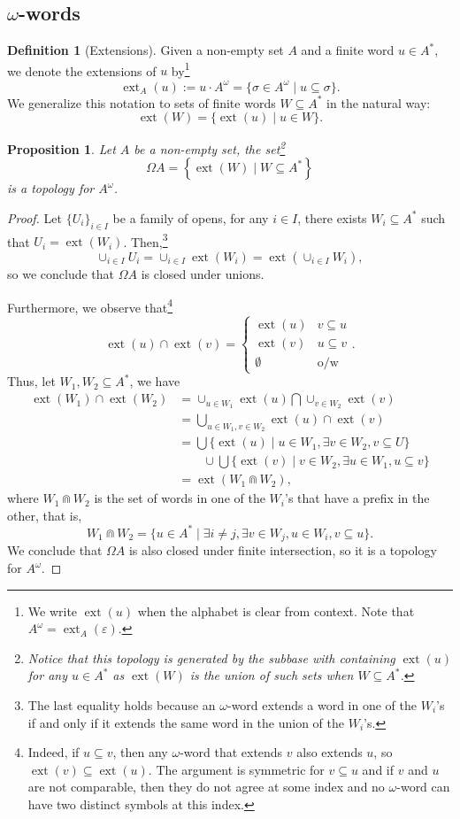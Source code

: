 \documentclass{tufte-handout} %
\newtheorem{prop}[thm]{Proposition}
\theoremstyle{definition}
\newtheorem{defn}[thm]{Definition}
\theoremstyle{remark}
\newcommand{\bra}[1]{\left(#1\right)}
\newcommand{\0}{\textsf{0}}
\newcommand{\1}{\textsf{1}}
\DeclareMathOperator{\ext}{ext}
\begin{document}
\subsection{$\omega$-words}
\begin{defn}[Extensions]
	Given a non-empty set $A$ and a finite word $u \in A^*$, we denote the extensions of $u$ by\footnote{We write $\ext(u)$ when the alphabet is clear from context. Note that $A^{\omega} = \ext_A(\varepsilon)$.}
	\[\ext_A(u) := u\cdot A^{\omega} = \{ \sigma \in A^{\omega} \mid u\subseteq \sigma\}.\]
	We generalize this notation to sets of finite words $W \subseteq A^*$ in the natural way: \[\ext(W) = \{ \ext(u) \mid u \in W\}.\]
\end{defn}
\begin{prop}
	Let $A$ be a non-empty set, the set\footnote{Notice that this topology is generated by the subbase with containing $\ext(u)$ for any $u \in A^*$ as $\ext(W)$ is the union of such sets when $W \subseteq A^*$.} \[ \Omega A = \left\{ \ext(W) \mid W \subseteq A^* \right\} \]
	is a topology for $A^{\omega}$.
\end{prop}
\begin{proof}
	Let $\{U_i\}_{i \in I}$ be a family of opens, for any $i \in I$, there exists $W_i \subseteq A^*$ such that $U_i = \ext(W_i)$. Then,\footnote{The last equality holds because an $\omega$-word extends a word in one of the $W_i$'s if and only if it extends the same word in the union of the $W_i$'s.}
	\[\cup_{i \in I} U_i = \cup_{i \in I}\ext(W_i) = \ext\bra{\cup_{i \in I} W_i},\]
	so we conclude that $\Omega A$ is closed under unions.
	
	Furthermore, we observe that\footnote{Indeed, if $u\subseteq v$, then any $\omega$-word that extends $v$ also extends $u$, so $\ext(v) \subseteq \ext(u)$. The argument is symmetric for $v\subseteq u$ and if $v$ and $u$ are not comparable, then they do not agree at some index and no $\omega$-word can have two distinct symbols at this index.} \[\ext(u) \cap \ext(v) = \begin{cases}\ext(u) & v \subseteq u\\\ext(v) &u\subseteq v\\ \emptyset &\text{o/w}\end{cases}.\]
	Thus, let $W_1, W_2 \subseteq A^*$, we have 
	\begin{align*}
	\ext(W_1) \cap \ext(W_2) &= \cup_{u \in W_1} \ext(u) \bigcap \cup_{v \in W_2} \ext(v)\\ &= \bigcup_{u \in W_1, v \in W_2} \ext(u) \cap \ext(v)\\ 
	&= \bigcup \{\ext(u) \mid u \in W_1,\exists v\in W_2, v \subseteq U\} \\ &\quad \quad \cup \bigcup \{\ext(v) \mid v \in W_2, \exists u \in W_1, u \subseteq v\}
	\\&= \ext(W_1 \Cap W_2),
	\end{align*}
	where $W_1 \Cap W_2$ is the set of words in one of the $W_i$'s that have a prefix in the other, that is, \[W_1 \Cap W_2 = \{u \in A^* \mid \exists i\neq j, \exists v \in W_j, u\in W_i, v\subseteq u\}.\]
	We conclude that $\Omega A$ is also closed under finite intersection, so it is a topology for $A^{\omega}$.
\end{proof}
\end{document}
